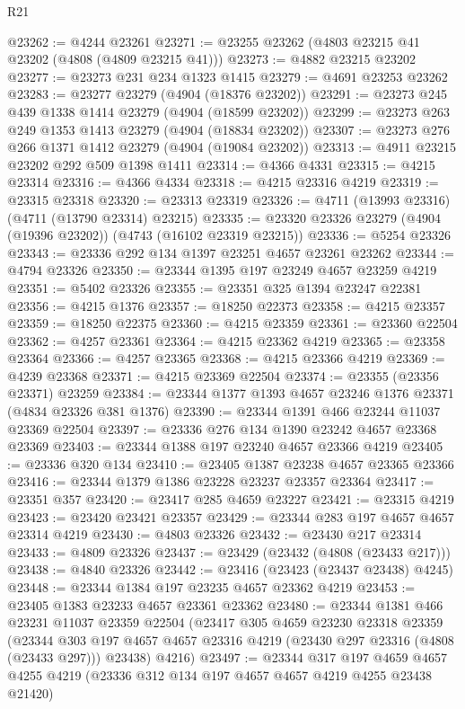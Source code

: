 \begin{lexlean}{R21}
\begin{coremodule}
@23262 := @4244 @23261
@23271 := @23255 @23262 (@4803 @23215 @41 @23202 (@4808 (@4809 @23215 @41)))
@23273 := @4882 @23215 @23202
@23277 := @23273 @231 @234 @1323 @1415
@23279 := @4691 @23253 @23262
@23283 := @23277 @23279 (@4904 (@18376 @23202))
@23291 := @23273 @245 @439 @1338 @1414 @23279 (@4904 (@18599 @23202))
@23299 := @23273 @263 @249 @1353 @1413 @23279 (@4904 (@18834 @23202))
@23307 := @23273 @276 @266 @1371 @1412 @23279 (@4904 (@19084 @23202))
@23313 := @4911 @23215 @23202 @292 @509 @1398 @1411
@23314 := @4366 @4331
@23315 := @4215 @23314
@23316 := @4366 @4334
@23318 := @4215 @23316 @4219
@23319 := @23315 @23318
@23320 := @23313 @23319
@23326 := @4711 (@13993 @23316) (@4711 (@13790 @23314) @23215)
@23335 := @23320 @23326 @23279 (@4904 (@19396 @23202)) (@4743 (@16102 @23319 @23215))
@23336 := @5254 @23326
@23343 := @23336 @292 @134 @1397 @23251 @4657 @23261 @23262
@23344 := @4794 @23326
@23350 := @23344 @1395 @197 @23249 @4657 @23259 @4219
@23351 := @5402 @23326
@23355 := @23351 @325 @1394 @23247 @22381
@23356 := @4215 @1376
@23357 := @18250 @22373
@23358 := @4215 @23357
@23359 := @18250 @22375
@23360 := @4215 @23359
@23361 := @23360 @22504
@23362 := @4257 @23361
@23364 := @4215 @23362 @4219
@23365 := @23358 @23364
@23366 := @4257 @23365
@23368 := @4215 @23366 @4219
@23369 := @4239 @23368
@23371 := @4215 @23369 @22504
@23374 := @23355 (@23356 @23371) @23259
@23384 := @23344 @1377 @1393 @4657 @23246 @1376 @23371 (@4834 @23326 @381 @1376)
@23390 := @23344 @1391 @466 @23244 @11037 @23369 @22504
@23397 := @23336 @276 @134 @1390 @23242 @4657 @23368 @23369
@23403 := @23344 @1388 @197 @23240 @4657 @23366 @4219
@23405 := @23336 @320 @134
@23410 := @23405 @1387 @23238 @4657 @23365 @23366
@23416 := @23344 @1379 @1386 @23228 @23237 @23357 @23364
@23417 := @23351 @357
@23420 := @23417 @285 @4659 @23227
@23421 := @23315 @4219
@23423 := @23420 @23421 @23357
@23429 := @23344 @283 @197 @4657 @4657 @23314 @4219
@23430 := @4803 @23326
@23432 := @23430 @217 @23314
@23433 := @4809 @23326
@23437 := @23429 (@23432 (@4808 (@23433 @217)))
@23438 := @4840 @23326
@23442 := @23416 (@23423 (@23437 @23438) @4245)
@23448 := @23344 @1384 @197 @23235 @4657 @23362 @4219
@23453 := @23405 @1383 @23233 @4657 @23361 @23362
@23480 := @23344
    @1381
    @466
    @23231
    @11037
    @23359
    @22504
    (@23417
      @305
      @4659
      @23230
      @23318
      @23359
      (@23344 @303 @197 @4657 @4657 @23316 @4219 (@23430 @297 @23316 (@4808 (@23433 @297))) @23438)
      @4216)
@23497 := @23344
    @317
    @197
    @4659
    @4657
    @4255
    @4219
    (@23336 @312 @134 @197 @4657 @4657 @4219 @4255 @23438 @21420)

\end{coremodule}
\end{lexlean}
